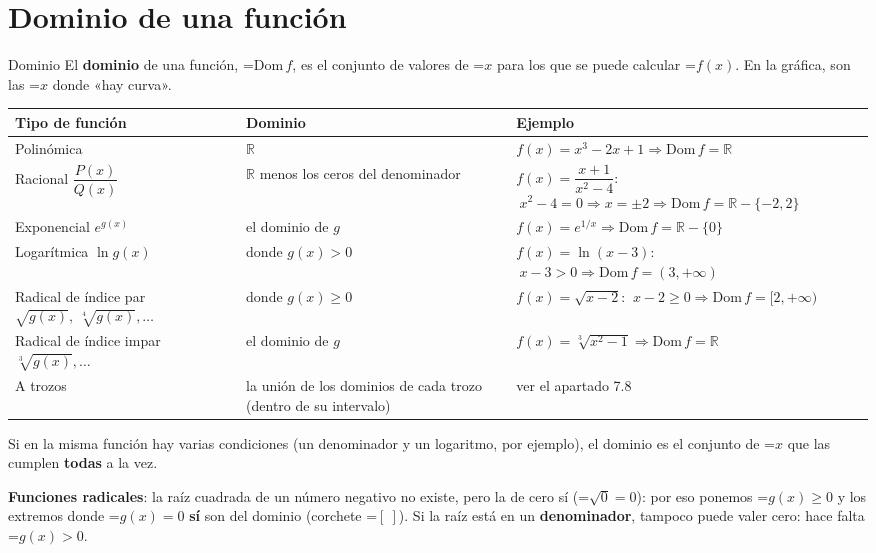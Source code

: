 \documentclass[11pt,a4paper]{article}
\newcommand{\fmm}[1]{\setbox0=\hbox{$#1$}\ifdim\wd0>\linewidth\[#1\]\else\mbox{\box0}\fi}
\newcommand{\fmuline}[1]{\textbf{\color{fmaccent}#1}}
\begin{document}
\section{Dominio de una función}\hypertarget{sec1}{}

  

  
\begin{fmdef}{Dominio}
El \textbf{dominio} de una función, \fmm{\mathrm{Dom}\,f}, es el conjunto de valores de \fmm{x} para los que se puede calcular \fmm{f(x)}. En la gráfica, son las \fmm{x} donde «hay curva».

      
\begin{center}\renewcommand{\arraystretch}{1.35}\small\begin{tabularx}{\linewidth}{>{\raggedright\arraybackslash}p{3.3cm}>{\raggedright\arraybackslash}p{4.5cm}>{\raggedright\arraybackslash}X}\toprule
\textbf{Tipo de función} & \textbf{Dominio} & \textbf{Ejemplo}\\\midrule
Polinómica & $\mathbb R$ & $f(x)=x^3-2x+1\Rightarrow\mathrm{Dom}\,f=\mathbb R$\\[3pt]
Racional $\dfrac{P(x)}{Q(x)}$ & $\mathbb R$ menos los ceros del denominador & $f(x)=\dfrac{x+1}{x^2-4}$: $\ x^2-4=0\Rightarrow x=\pm2\Rightarrow\mathrm{Dom}\,f=\mathbb R-\{-2,2\}$\\[3pt]
Exponencial $e^{g(x)}$ & el dominio de $g$ & $f(x)=e^{1/x}\Rightarrow\mathrm{Dom}\,f=\mathbb R-\{0\}$\\[3pt]
Logarítmica $\ln g(x)$ & donde $g(x)\gt0$ & $f(x)=\ln(x-3)$: $\ x-3\gt0\Rightarrow\mathrm{Dom}\,f=(3,+\infty)$\\[3pt]
Radical de índice par $\sqrt{g(x)},\ \sqrt[4]{g(x)},\dots$ & donde $g(x)\geq0$ & $f(x)=\sqrt{x-2}$: $\ x-2\geq0\Rightarrow\mathrm{Dom}\,f=[2,+\infty)$\\[3pt]
Radical de índice impar $\sqrt[3]{g(x)},\dots$ & el dominio de $g$ & $f(x)=\sqrt[3]{x^2-1}\Rightarrow\mathrm{Dom}\,f=\mathbb R$\\[3pt]
A trozos & la unión de los dominios de cada trozo (dentro de su intervalo) & ver el apartado 7.8\\[3pt]
\bottomrule\end{tabularx}\end{center}

      
\begin{fmnote}Si en la misma función hay varias condiciones (un denominador y un logaritmo, por ejemplo), el dominio es el conjunto de \fmm{x} que las cumplen \textbf{todas} a la vez.\end{fmnote}

      
\begin{fmnote}\fmuline{Funciones radicales}: la raíz cuadrada de un número negativo no existe, pero la de cero sí (\fmm{\sqrt0=0}): por eso ponemos \fmm{g(x)\geq0} y los extremos donde \fmm{g(x)=0} \textbf{sí} son del dominio (corchete \fmm{[\ ]}). Si la raíz está en un \textbf{denominador}, tampoco puede valer cero: hace falta \fmm{g(x)\gt0}.\end{fmnote}
\end{fmdef}
\end{document}
